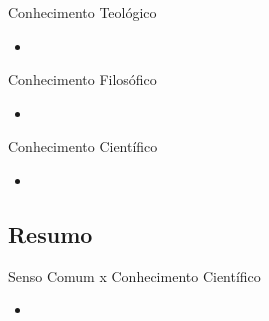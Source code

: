 \documentclass{beamer}
\begin{document}

\begin{frame}{Conhecimento Teológico}
  \begin{itemize}
  \item 
  \end{itemize}
\end{frame}


\begin{frame}{Conhecimento Filosófico}
  \begin{itemize}
  \item 
  \end{itemize}
\end{frame}


\begin{frame}{Conhecimento Científico}
  \begin{itemize}
  \item 
  \end{itemize}
\end{frame}


\subsection{Resumo}

\begin{frame}{Senso Comum x Conhecimento Científico}
  \begin{itemize}
  \item 
  \end{itemize}
\end{frame}
\end{document}
